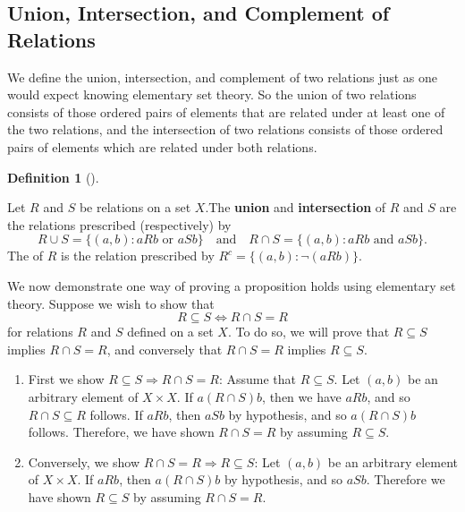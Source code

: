 \documentclass[
  letterpaper,
  10pt,
  reqno,
  twopage,
  openany]{book}
\theoremstyle{plain}
\theoremstyle{definition}
\theoremstyle{definition}
\newtheorem{definition}{Definition}[chapter]
\theoremstyle{definition}
\theoremstyle{plain}
\theoremstyle{plain}
\theoremstyle{remark}
\begin{document}
\hypertarget{union-intersection-and-complement-of-relations}{%
\subsection{Union, Intersection, and Complement of
Relations}\label{union-intersection-and-complement-of-relations}}

We define the union, intersection, and complement of two relations just
as one would expect knowing elementary set theory. So the union of two
relations consists of those ordered pairs of elements that are related
under at least one of the two relations, and the intersection of two
relations consists of those ordered pairs of elements which are related
under both relations.

\leavevmode{}%
\begin{definition}[]\label{def-relations-union-intersection}

Let \(R\) and \(S\) be relations on a set \(X\).The 
\textbf{union} and  \textbf{intersection} of \(R\)
and \(S\) are the relations prescribed (respectively) by \[
R\cup S  = \{(a,b) : aRb \text{ or } aSb\}
\quad \text{and} \quad
R\cap S  = \{(a,b) :  aRb \text{ and } aSb\}. 
\] The  of \(R\) is the relation prescribed by
\(R^c = \{(a,b): \neg (aRb)\}\).

\end{definition}

We now demonstrate one way of proving a proposition holds using
elementary set theory. Suppose we wish to show that \begin{equation}
\label{subeq}
R\subseteq S
\Leftrightarrow
R\cap S=R
\end{equation} for relations \(R\) and \(S\) defined on a set \(X\). To
do so, we will prove that \(R\subseteq S\) implies \(R\cap S=R\), and
conversely that \(R\cap S=R\) implies \(R\subseteq S\).\\

\begin{enumerate}
\item
First we show $R\subseteq S \Rightarrow R\cap S=R$: 
Assume that $R\subseteq S$. 
Let $(a,b)$ be an arbitrary element of $X\times X$. 
If $a(R\cap S)b$, then we have $aRb$, and so $R\cap S\subseteq R$ follows. 
If $aRb$, then $aSb$ by hypothesis, and so $a(R\cap S)b$ follows.
Therefore, we have shown $R\cap S=R$ by assuming $R\subseteq S$. 
\item
Conversely, we show $R\cap S=R\Rightarrow R\subseteq S$: 
Let $(a,b)$ be an arbitrary element of $X\times X$. 
If $aRb$, then $a(R\cap S)b$ by hypothesis, and so $aSb$.
Therefore we have shown $R\subseteq S$ by assuming $R\cap S=R$.
\end{enumerate}
\end{document}
